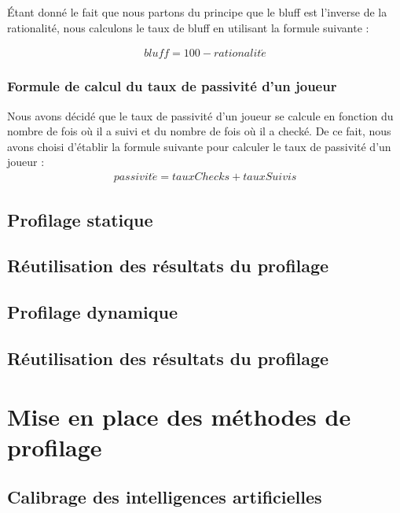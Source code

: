 \documentclass{report}
\begin{document}
Étant donné le fait que nous partons du principe que le bluff est l'inverse de la rationalité, nous calculons le taux de bluff en utilisant la formule suivante :

\begin{align*}
	bluff=100-rationalit\acute{e}
\end{align*}


\subsection{Formule de calcul du taux de passivité d'un joueur}

Nous avons décidé que le taux de passivité d'un joueur se calcule en fonction du nombre de fois où il a suivi et du nombre de fois où il a checké. De ce fait, nous avons choisi d'établir la formule suivante pour calculer le taux de passivité d'un joueur : 
\begin{align*}
	passivit\acute{e}=tauxChecks+tauxSuivis
\end{align*}


\section{Profilage statique}

\section{Réutilisation des résultats du profilage}

\section{Profilage dynamique}

\section{Réutilisation des résultats du profilage}


\chapter{Mise en place des méthodes de profilage}

\section{Calibrage des intelligences artificielles}
\end{document}
